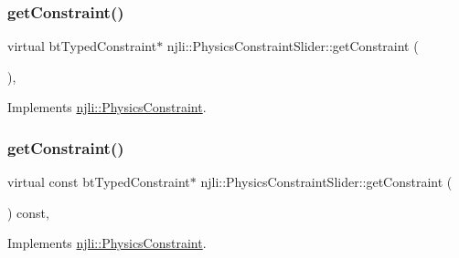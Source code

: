 \subsubsection{\texorpdfstring{get\+Constraint()}{getConstraint()}\hspace{0.1cm}{\footnotesize\ttfamily [1/2]}}
{\footnotesize\ttfamily virtual bt\+Typed\+Constraint$\ast$ njli\+::\+Physics\+Constraint\+Slider\+::get\+Constraint (\begin{DoxyParamCaption}{ }\end{DoxyParamCaption})\hspace{0.3cm}{\ttfamily [protected]}, {\ttfamily [virtual]}}



Implements \mbox{\hyperlink{classnjli_1_1_physics_constraint_a0a22d54c2c896af49fa57db9be76a5da}{njli\+::\+Physics\+Constraint}}.

\mbox{\label{classnjli_1_1_physics_constraint_slider_aff5bac3b1c256860d6f8214d64ca8a61}} 
\subsubsection{\texorpdfstring{get\+Constraint()}{getConstraint()}\hspace{0.1cm}{\footnotesize\ttfamily [2/2]}}
{\footnotesize\ttfamily virtual const bt\+Typed\+Constraint$\ast$ njli\+::\+Physics\+Constraint\+Slider\+::get\+Constraint (\begin{DoxyParamCaption}{ }\end{DoxyParamCaption}) const\hspace{0.3cm}{\ttfamily [protected]}, {\ttfamily [virtual]}}



Implements \mbox{\hyperlink{classnjli_1_1_physics_constraint_af4cb8c0158a044f75fe61f89cc278338}{njli\+::\+Physics\+Constraint}}.

\mbox{\label{classnjli_1_1_physics_constraint_slider_ae8c4b265141b12546818c7896867f5a7}} 
